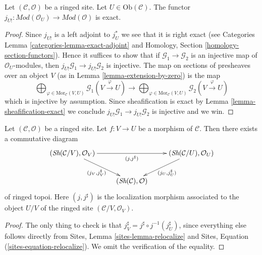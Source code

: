 \begin{lemma}
\label{lemma-extension-by-zero-exact}
Let $(\mathcal{C}, \mathcal{O})$ be a ringed site.
Let $U \in \text{Ob}(\mathcal{C})$.
The functor
$j_{U!} : \textit{Mod}(\mathcal{O}_U) \to \textit{Mod}(\mathcal{O})$
is exact.
\end{lemma}

\begin{proof}
Since $j_{U!}$ is a left adjoint to $j_U^*$ we see that it is right exact
(see Categories Lemma \ref{categories-lemma-exact-adjoint}
and Homology, Section \ref{homology-section-functors}).
Hence it suffices to show that if $\mathcal{G}_1 \to \mathcal{G}_2$
is an injective map of $\mathcal{O}_U$-modules, then
$j_{U!}\mathcal{G}_1 \to j_{U!}\mathcal{G}_2$ is injective.
The map on sections of presheaves over an object $V$
(as in Lemma \ref{lemma-extension-by-zero}) is the map
$$
\bigoplus\nolimits_{\varphi \in \text{Mor}_{\mathcal{C}}(V, U)}
\mathcal{G}_1(V \xrightarrow{\varphi} U)
\longrightarrow
\bigoplus\nolimits_{\varphi \in \text{Mor}_{\mathcal{C}}(V, U)}
\mathcal{G}_2(V \xrightarrow{\varphi} U)
$$
which is injective by assumption. Since sheafification is exact by
Lemma \ref{lemma-sheafification-exact}
we conclude $j_{U!}\mathcal{G}_1 \to j_{U!}\mathcal{G}_2$ is injective and
we win.
\end{proof}

\begin{lemma}
\label{lemma-relocalize}
Let $(\mathcal{C}, \mathcal{O})$ be a ringed site.
Let $f : V \to U$ be a morphism of $\mathcal{C}$.
Then there exists a commutative diagram
$$
\xymatrix{
(\textit{Sh}(\mathcal{C}/V), \mathcal{O}_V)
\ar[rd]_{(j_V, j_V^\sharp)} \ar[rr]_{(j, j^\sharp)} & &
(\textit{Sh}(\mathcal{C}/U), \mathcal{O}_U)
\ar[ld]^{(j_U, j_U^\sharp)} \\
& (\textit{Sh}(\mathcal{C}), \mathcal{O}) &
}
$$
of ringed topoi. Here $(j, j^\sharp)$ is the localization morphism
associated to the object $U/V$ of the ringed site
$(\mathcal{C}/V, \mathcal{O}_V)$.
\end{lemma}

\begin{proof}
The only thing to check is that
$j_V^\sharp = j^\sharp \circ j^{-1}(j_U^\sharp)$,
since everything else follows directly from
Sites, Lemma \ref{sites-lemma-relocalize} and
Sites, Equation (\ref{sites-equation-relocalize}).
We omit the verification of the equality.
\end{proof}

